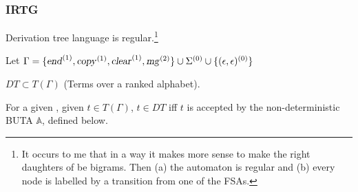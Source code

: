 \documentclass[12pt]{article}
\theoremstyle{definition}
\begin{document}
\subsubsection{IRTG}
\label{sec:irtg}

Derivation tree language is regular.\footnote{It occurs to me that
  in a way it makes more sense to make the right daughters of \mg be
  bigrams. Then (a) the automaton is regular and (b) every node is
  labelled by a transition from one of the FSAs.}

Let  $\Gamma = \{\text{\textsl{end}}^{(1)},\text{\textsl{copy}}^{(1)},\text{\textsl{clear}}^{(1)},\text{\textsl{mg}}^{(2)}\}\cup\Sigma^{(0)}\cup\{(\epsilon,\epsilon)^{(0)}\}$

$DT \subset T(\Gamma)$ (Terms over a ranked alphabet).

For a given \BIGR, given $t\in T(\Gamma)$, $t\in DT$ iff $t$ is accepted by the non-deterministic BUTA $\mathbb{A}$, defined below.
\end{document}
